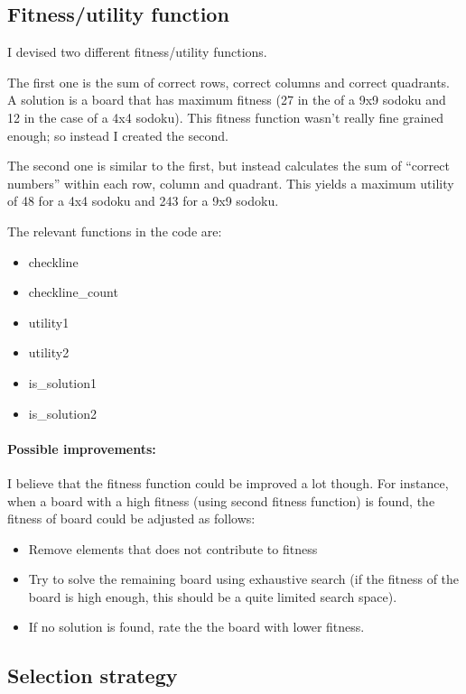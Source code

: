 \documentclass{article}
\begin{document}
\subsection{Fitness/utility function}

I devised two different fitness/utility functions.

The first one is the sum of correct rows, correct columns and
correct quadrants. A solution is a board that has maximum 
fitness (27 in the of a 9x9 sodoku and 12 in the case of a 4x4 
sodoku). This fitness
function wasn't really fine grained enough; so instead I created
the second. 

The second one is similar to the first, but instead calculates 
the sum of ``correct numbers'' within each row, column and quadrant.
This yields a maximum utility of 48 for a 4x4 sodoku and 243 for a 
9x9 sodoku.

The relevant functions in the code are:
\begin{itemize}
\item checkline
\item checkline\_count
\item utility1
\item utility2
\item is\_solution1
\item is\_solution2
\end{itemize}

\paragraph{Possible improvements:}

I believe that the fitness function could be improved a lot though.
For instance, when a board with a high fitness (using second fitness
function) is found, the fitness of board could be adjusted as follows:
\begin{itemize}
\item Remove elements that does not contribute to fitness 
\item Try to solve the remaining board using exhaustive search (if the
  fitness of the board is high enough, this should be a quite limited search
  space). 
\item If no solution is found, rate the the board with lower fitness.
\end{itemize}

\subsection{Selection strategy}
\end{document}
